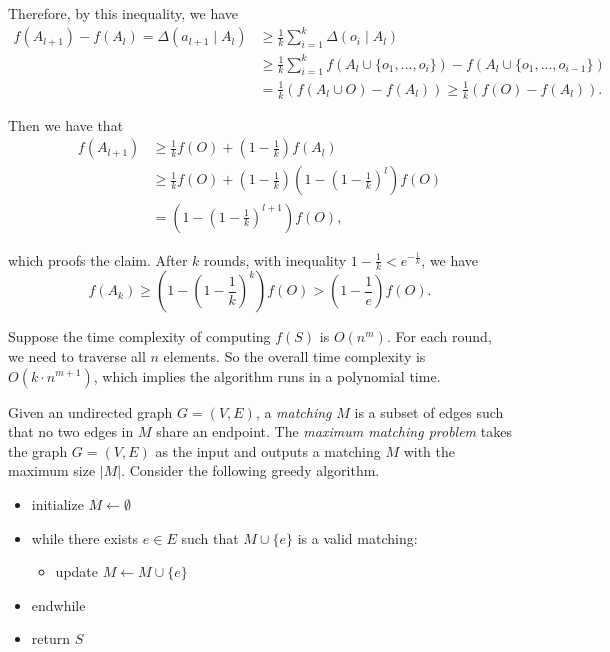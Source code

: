 \documentclass{oxmathproblems}
\begin{document}
\begin{questions}
\begin{Solution}
Therefore, by this inequality, we have \begin{align*}
	f(A_{l+1})-f(A_l) = \Delta(a_{l+1}\mid A_l) &\ge \frac{1}{k}\sum_{i=1}^k\Delta (o_i\mid A_l)\\
        &\ge \frac{1}{k}\sum_{i=1}^k f(A_l\cup \{o_1, ..., o_i\})-f(A_l\cup \{o_1, ..., o_{i-1}\})\\
        &=\frac{1}{k}(f(A_l\cup O)-f(A_l)) \ge \frac{1}{k}(f(O)-f(A_l)).
\end{align*}

Then we have that \begin{align*}
    f(A_{l+1})&\ge \frac{1}{k}f(O)+(1-\frac{1}{k})f(A_l)\\
    &\ge \frac{1}{k}f(O)+(1-\frac{1}{k})(1-(1-\frac{1}{k})^l)f(O)\\
    &= (1-(1-\frac{1}{k})^{l+1})f(O),
\end{align*}

which proofs the claim. After $k$ rounds, with inequality $1-\frac{1}{k}<e^{-\frac{1}{k}}$, we have $$f(A_k)\ge (1-(1-\frac{1}{k})^k)f(O)>(1-\frac{1}{e})f(O).$$

Suppose the time complexity of computing $f(S)$ is $O(n^m)$. For each round, we need to traverse all $n$ elements. So the overall time complexity is $O(k\cdot n^{m+1})$, which implies the algorithm runs in a polynomial time.

\end{Solution}
\newpage
  
\miquestion[25]
Given an undirected graph $G=(V,E)$, a \emph{matching} $M$ is a subset of edges such that no two edges in $M$ share an endpoint.
The \emph{maximum matching problem} takes the graph $G=(V,E)$ as the input and outputs a matching $M$ with the maximum size $|M|$.
Consider the following greedy algorithm.
\begin{itemize}
    \item initialize $M\leftarrow\emptyset$\;
    \item while there exists $e\in E$ such that $M\cup\{e\}$ is a valid matching:
    \begin{itemize}
        \item update $M\leftarrow M\cup\{e\}$\;
    \end{itemize}
    \item endwhile
    \item return $S$\;
\end{itemize}
\end{questions}
\end{document}
